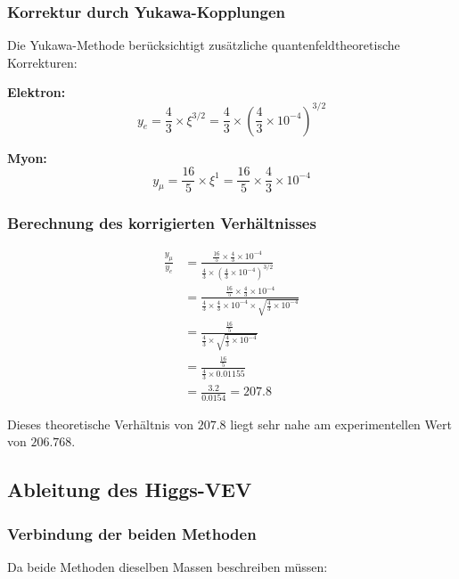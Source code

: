 \subsubsection{Korrektur durch Yukawa-Kopplungen}

Die Yukawa-Methode berücksichtigt zusätzliche quantenfeldtheoretische Korrekturen:

\textbf{Elektron:}
\begin{equation}
	y_e = \frac{4}{3} \times \xi^{3/2} = \frac{4}{3} \times \left(\frac{4}{3} \times 10^{-4}\right)^{3/2}
\end{equation}

\textbf{Myon:}
\begin{equation}
	y_\mu = \frac{16}{5} \times \xi^1 = \frac{16}{5} \times \frac{4}{3} \times 10^{-4}
\end{equation}

\subsubsection{Berechnung des korrigierten Verhältnisses}

\begin{align}
	\frac{y_\mu}{y_e} &= \frac{\frac{16}{5} \times \frac{4}{3} \times 10^{-4}}{\frac{4}{3} \times \left(\frac{4}{3} \times 10^{-4}\right)^{3/2}}\\
	&= \frac{\frac{16}{5} \times \frac{4}{3} \times 10^{-4}}{\frac{4}{3} \times \frac{4}{3} \times 10^{-4} \times \sqrt{\frac{4}{3} \times 10^{-4}}}\\
	&= \frac{\frac{16}{5}}{\frac{4}{3} \times \sqrt{\frac{4}{3} \times 10^{-4}}}\\
	&= \frac{\frac{16}{5}}{\frac{4}{3} \times 0.01155}\\
	&= \frac{3.2}{0.0154} = 207.8
\end{align}

Dieses theoretische Verhältnis von $207.8$ liegt sehr nahe am experimentellen Wert von $206.768$.

\subsection{Ableitung des Higgs-VEV}

\subsubsection{Verbindung der beiden Methoden}

Da beide Methoden dieselben Massen beschreiben müssen:

